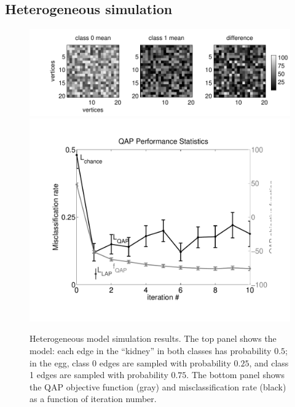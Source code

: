 \documentclass{article} %
\begin{document}


\subsection{Heterogeneous simulation} %
\label{sub:heterogeneous_simulation}


\begin{figure}[htbp]
	\centering			
	\includegraphics[width=1\linewidth]{../figs/hetero_model}
	\includegraphics[width=1\linewidth]{../figs/hetero_performance}
	\caption{Heterogeneous model simulation results. The top panel shows the model: each edge in the ``kidney'' in both classes has probability $0.5$; in the egg, class 0 edges are sampled with probability $0.25$, and class 1 edges are sampled with probability $0.75$. The bottom panel shows the QAP objective function (gray) and misclassification rate (black) as a function of iteration number.  }
	\label{fig:hetero}
\end{figure}



\end{document}
